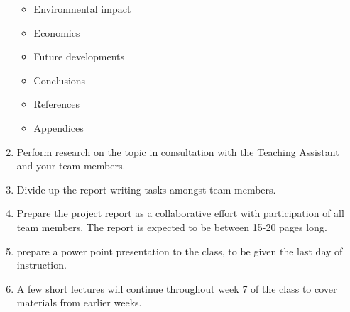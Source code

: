 \documentclass[11pt]{article}
\begin{document}
\begin{enumerate}
\begin{itemize}
        \item Environmental impact
        \item Economics
        \item Future developments
        \item Conclusions
        \item References
        \item Appendices
    \end{itemize}
    \item Perform research on the topic in consultation with the Teaching Assistant and your team members.
    \item Divide up the report writing tasks amongst team members.
    \item Prepare the project report as a collaborative effort with participation of all team members. The report is expected to be between 15-20 pages long.
    \item prepare a power point presentation to the class, to be given the last day of instruction.
    \item A few short lectures will continue throughout week 7 of the class to cover materials from earlier weeks.
\end{enumerate}
\end{document}
